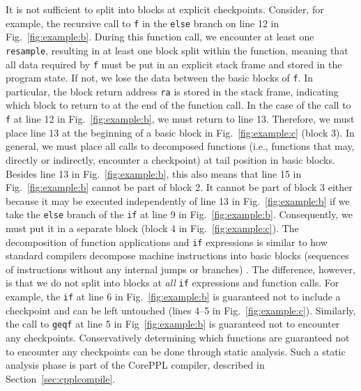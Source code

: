 \documentclass[runningheads]{llncs}
\newcommand{\clstinline}{\lstinline[language=CorePPL]}
\begin{document}
It is not sufficient to split into blocks at explicit checkpoints.
Consider, for example, the recursive call to \lstinline!f! in the \clstinline!else! branch on line 12 in Fig.~\ref{fig:example:b}.
During this function call, we encounter at least one \clstinline!resample!, resulting in at least one block split within the function,
meaning that all data required by \lstinline!f! must be put in an explicit stack frame and stored in the program state. If not, we lose the data between the basic blocks of \lstinline!f!.
In particular, the block return address \lstinline!ra! is stored in the stack frame, indicating which block to return to at the end of the function call.
In the case of the call to \lstinline!f! at line 12 in Fig.~\ref{fig:example:b}, we must return to line 13.
Therefore, we must place line 13 at the beginning of a basic block in Fig.~\ref{fig:example:c} (block 3).
In general, we must place all calls to decomposed functions (i.e., functions that may, directly or indirectly, encounter a checkpoint) at tail position in basic blocks.
Besides line 13 in Fig.~\ref{fig:example:b}, this also means that line 15 in Fig.~\ref{fig:example:b} cannot be part of block 2.
It cannot be part of block 3 either because it may be executed independently of line 13 in Fig.~\ref{fig:example:b} if we take the \clstinline!else! branch of the \clstinline!if! at line 9 in Fig.~\ref{fig:example:b}.
Consequently, we must put it in a separate block (block 4 in Fig.~\ref{fig:example:c}).
The decomposition of function applications and \clstinline!if! expressions is similar to how standard compilers decompose machine instructions into basic blocks (sequences of instructions without any internal jumps or branches) \cite{aho2006compilers}.
The difference, however, is that we do not split into blocks at \emph{all} \clstinline!if! expressions and function calls.
For example, the \clstinline!if! at line 6 in Fig.~\ref{fig:example:b} is guaranteed not to include a checkpoint and can be left untouched (lines 4--5 in Fig.~\ref{fig:example:c}).
Similarly, the call to \lstinline!geqf! at line 5 in Fig~\ref{fig:example:b} is guaranteed not to encounter any checkpoints.
Conservatively determining which functions are guaranteed not to encounter any checkpoints can be done through static analysis.
Such a static analysis phase is part of the CorePPL compiler, described in Section~\ref{sec:cpplcompile}.
\end{document}
